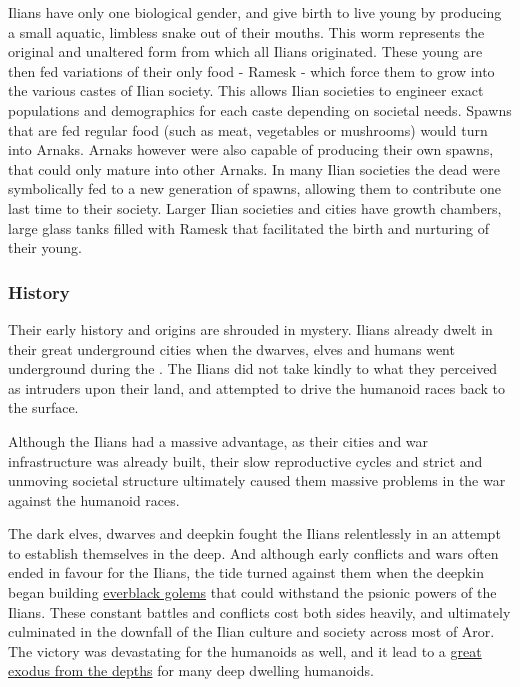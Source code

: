 Ilians have only one biological gender, and give birth to live young by
producing a small aquatic, limbless snake out of their mouths. This worm
represents the original and unaltered form from which all Ilians
originated. These young are then fed variations of their only food - Ramesk -
which force them to grow into the various castes of Ilian society. This allows
Ilian societies to engineer exact populations and demographics for each caste
depending on societal needs. Spawns that are fed regular food (such as meat,
vegetables or mushrooms) would turn into Arnaks. Arnaks however were also
capable of producing their own spawns, that could only mature into other
Arnaks. In many Ilian societies the dead were symbolically fed to a new
generation of spawns, allowing them to contribute one last time to their
society. Larger Ilian societies and cities have growth chambers, large glass
tanks filled with Ramesk that facilitated the birth and nurturing of their
young.

\subsubsection{History}

Their early history and origins are shrouded in mystery. Ilians already dwelt
in their great underground cities when the dwarves, elves and humans went
underground during the . The Ilians did not take kindly to
what they perceived as intruders upon their land, and attempted to drive the
humanoid races back to the surface.

Although the Ilians had a massive advantage, as their cities and war
infrastructure was already built, their slow reproductive cycles and strict
and unmoving societal structure ultimately caused them massive problems in
the war against the humanoid races.

The dark elves, dwarves and deepkin fought the Ilians relentlessly in an
attempt to establish themselves in the deep. And although early conflicts and
wars often ended in favour for the Ilians, the tide turned against them when
the deepkin began building \hyperref[sec:Everblack Golem]{everblack golems}
that could withstand the psionic powers of the Ilians. These constant battles
and conflicts cost both sides heavily, and ultimately culminated in the
downfall of the Ilian culture and society across most of Aror. The victory was
devastating for the humanoids as well, and it lead to a \hyperref[sec:Exodus
  from the Depths]{great exodus from the depths} for many deep dwelling
humanoids.


